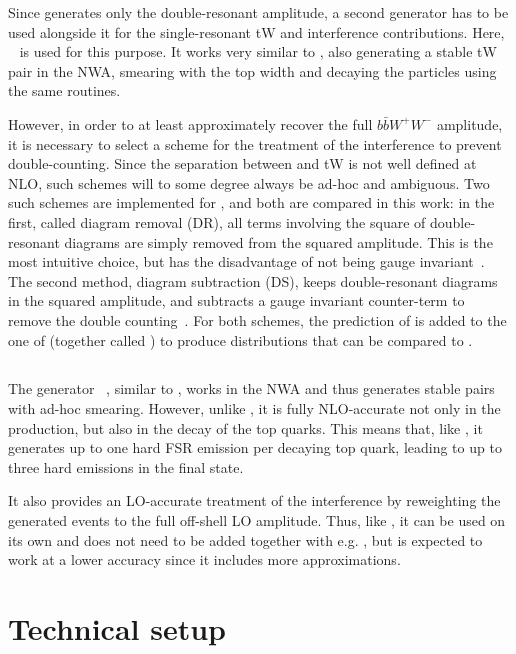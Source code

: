 Since \hvq generates only the double-resonant \ttbar amplitude, a second generator has to be used alongside it for the single-resonant tW and \tttW interference contributions. Here, \ST~\cite{Re:2010bp} is used for this purpose. It works very similar to \hvq, also generating a stable tW pair in the NWA, smearing with the top width and decaying the particles using the same routines.

However, in order to at least approximately recover the full $b \bar{b} W^+ W^-$ amplitude, it is necessary to select a scheme for the treatment of the \tttW interference to prevent double-counting. Since the separation between \ttbar and tW is not well defined at NLO, such schemes will to some degree always be ad-hoc and ambiguous. Two such schemes are implemented for \ST, and both are compared in this work: in the first, called diagram removal (DR), all terms involving the square of double-resonant diagrams are simply removed from the squared amplitude. This is the most intuitive choice, but has the disadvantage of not being gauge invariant~\cite{Frixione:2008yi}. The second method, diagram subtraction (DS), keeps double-resonant diagrams in the squared amplitude, and subtracts a gauge invariant counter-term to remove the double counting~\cite{Tait:1999cf,Frixione:2008yi,Re:2010bp}. For both schemes, the prediction of \ST is added to the one of \hvq (together called \tttWsum) to produce distributions that can be compared to \bbfourl.

\subsection{\texorpdfstring{\ttb}{ttb\_NLO\_dec}}

The generator \ttb~\cite{Campbell:2014kua}, similar to \hvq, works in the NWA and thus generates stable \ttbar pairs with ad-hoc smearing. However, unlike \hvq, it is fully NLO-accurate not only in the production, but also in the decay of the top quarks. This means that, like \bbfourl, it generates up to one hard FSR emission per decaying top quark, leading to up to three hard emissions in the final state. 

It also provides an LO-accurate treatment of the \tttW interference by reweighting the generated \ttbar events to the full off-shell LO amplitude. Thus, like \bbfourl, it can be used on its own and does not need to be added together with e.g. \ST, but is expected to work at a lower accuracy since it includes more approximations.

\section{Technical setup}

